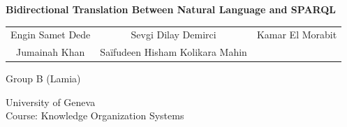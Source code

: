 \documentclass[11pt,a4paper]{article}
\begin{document}
\begin{titlepage}
    \centering

    \vspace*{2.2cm}

    {\Huge\bfseries
    Bidirectional Translation Between Natural Language and SPARQL
    \par}

    \vspace{0.8cm}

    {\large
    \begin{tabular}{ccc}
        Engin Samet Dede & Sevgi Dilay Demirci & Kamar El Morabit \\[0.6em]
        Jumainah Khan    & Saïfudeen Hisham Kolikara Mahin
    \end{tabular}
    \par}

    \vspace{2cm}

    {\large Group B (Lamia)\par}

    \vspace{0.4cm}

    {\normalsize
    University of Geneva\\[0.25em]
    Course: Knowledge Organization Systems
    \par}

    \vfill
\end{titlepage}
\end{document}

